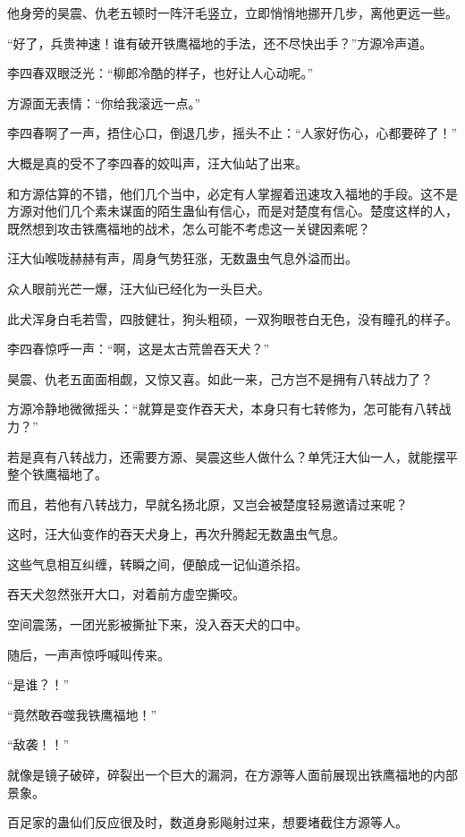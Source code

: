 \begin{this_body}
他身旁的昊震、仇老五顿时一阵汗毛竖立，立即悄悄地挪开几步，离他更远一些。

“好了，兵贵神速！谁有破开铁鹰福地的手法，还不尽快出手？”方源冷声道。

李四春双眼泛光：“柳郎冷酷的样子，也好让人心动呢。”

方源面无表情：“你给我滚远一点。”

李四春啊了一声，捂住心口，倒退几步，摇头不止：“人家好伤心，心都要碎了！”

大概是真的受不了李四春的姣叫声，汪大仙站了出来。

和方源估算的不错，他们几个当中，必定有人掌握着迅速攻入福地的手段。这不是方源对他们几个素未谋面的陌生蛊仙有信心，而是对楚度有信心。楚度这样的人，既然想到攻击铁鹰福地的战术，怎么可能不考虑这一关键因素呢？

汪大仙喉咙赫赫有声，周身气势狂涨，无数蛊虫气息外溢而出。

众人眼前光芒一爆，汪大仙已经化为一头巨犬。

此犬浑身白毛若雪，四肢健壮，狗头粗硕，一双狗眼苍白无色，没有瞳孔的样子。

李四春惊呼一声：“啊，这是太古荒兽吞天犬？”

昊震、仇老五面面相觑，又惊又喜。如此一来，己方岂不是拥有八转战力了？

方源冷静地微微摇头：“就算是变作吞天犬，本身只有七转修为，怎可能有八转战力？”

若是真有八转战力，还需要方源、昊震这些人做什么？单凭汪大仙一人，就能摆平整个铁鹰福地了。

而且，若他有八转战力，早就名扬北原，又岂会被楚度轻易邀请过来呢？

这时，汪大仙变作的吞天犬身上，再次升腾起无数蛊虫气息。

这些气息相互纠缠，转瞬之间，便酿成一记仙道杀招。

吞天犬忽然张开大口，对着前方虚空撕咬。

空间震荡，一团光影被撕扯下来，没入吞天犬的口中。

随后，一声声惊呼喊叫传来。

“是谁？！”

“竟然敢吞噬我铁鹰福地！”

“敌袭！！”

就像是镜子破碎，碎裂出一个巨大的漏洞，在方源等人面前展现出铁鹰福地的内部景象。

百足家的蛊仙们反应很及时，数道身影飚射过来，想要堵截住方源等人。


\end{this_body}
